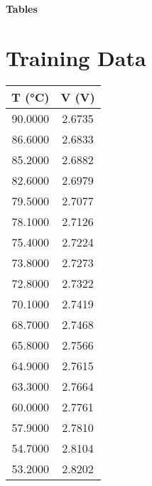 \documentclass[journal]{IEEEtran}
\begin{document}
\begin{center}
\LARGE \textbf{Tables}
\end{center}

\vspace{1cm}

\section*{Training Data}

\begin{table}[h!]
\centering
\begin{tabular}{|c|c|}\hline
\textbf{T (°C)} & \textbf{V (V)} \\\hline

90.0000 & 2.6735 \\\hline

86.6000 & 2.6833 \\\hline
85.2000 & 2.6882 \\\hline

82.6000 & 2.6979 \\\hline

79.5000 & 2.7077 \\\hline

78.1000 & 2.7126 \\\hline

75.4000 & 2.7224 \\\hline

73.8000 & 2.7273 \\\hline

72.8000 & 2.7322 \\\hline

70.1000 & 2.7419 \\\hline

68.7000 & 2.7468 \\\hline

65.8000 & 2.7566 \\\hline

64.9000 & 2.7615 \\\hline

63.3000 & 2.7664 \\\hline

60.0000 & 2.7761 \\\hline

57.9000 & 2.7810 \\\hline

54.7000 & 2.8104 \\\hline

53.2000 & 2.8202 \\\hline


\end{tabular}
\end{table}
\end{document}
